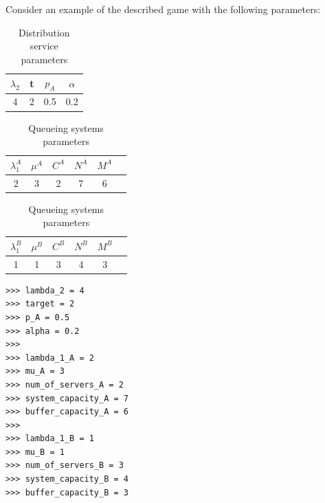 Consider an example of the described game with the following parameters:

\begin{table}[H]
    \caption{Distribution service parameters}
    \begin{center}
        \begin{tabular}{||c|c|c|c||}
            \hline
            \(\lambda_2\) & t & \(p_A\) & \(\alpha\) \\
            \hline\hline
            4 & 2 & 0.5 & 0.2 \\
            \hline
        \end{tabular}
    \end{center}
    \label{tab:implemetation_dist_service_parameters}
\end{table}

\begin{table}[H]
    \caption{Queueing systems parameters}
    \begin{center}
        \begin{tabular}{||c|c|c|c|c|c||}
            \hline
            \(\lambda_1^A\) & \(\mu^A\) & \(C^A\) & \(N^A\) & \(M^A\) \\
            \hline
            2 & 3 & 2 & 7 & 6 \\
            \hline
        \end{tabular}

        \vspace{0.5cm}
        
        \begin{tabular}{||c|c|c|c|c|c||}
            \hline
            \(\lambda_1^B\) & \(\mu^B\) & \(C^B\) & \(N^B\) & \(M^B\) \\
            \hline
            1 & 1 & 3 & 4 & 3 \\
            \hline
        \end{tabular}
    \end{center}
    \label{tab:implemetation_queueing_systems_parameters}
\end{table}


\begin{lstlisting}[style=pystyle]
>>> lambda_2 = 4
>>> target = 2
>>> p_A = 0.5
>>> alpha = 0.2
>>> 
>>> lambda_1_A = 2
>>> mu_A = 3
>>> num_of_servers_A = 2
>>> system_capacity_A = 7
>>> buffer_capacity_A = 6
>>> 
>>> lambda_1_B = 1
>>> mu_B = 1
>>> num_of_servers_B = 3
>>> system_capacity_B = 4
>>> buffer_capacity_B = 3

\end{lstlisting}

